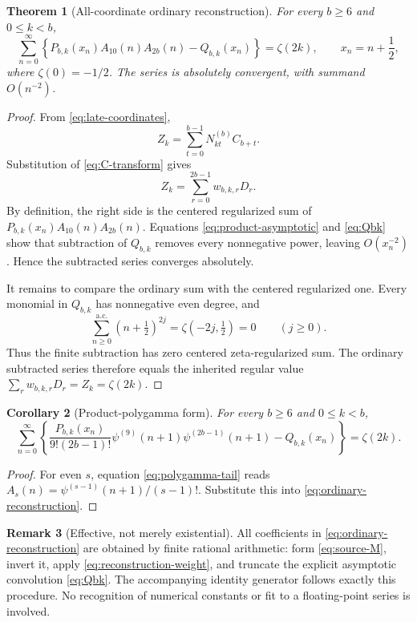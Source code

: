 \documentclass[11pt]{article}
\newtheorem{theorem}{Theorem}[section]
\newtheorem{corollary}[theorem]{Corollary}
\theoremstyle{definition}
\newtheorem{remark}[theorem]{Remark}
\begin{document}
\begin{theorem}[All-coordinate ordinary reconstruction]
\label{thm:ordinary-reconstruction}
For every $b\ge6$ and $0\le k<b$,
\begin{equation}
 \boxed{\displaystyle
 \sum_{n=0}^{\infty}
 \left\{
 P_{b,k}(x_n)A_{10}(n)A_{2b}(n)-Q_{b,k}(x_n)
 \right\}=\zeta(2k),}
 \qquad x_n=n+\frac12,
 \label{eq:ordinary-reconstruction}
\end{equation}
where $\zeta(0)=-1/2$.  The series is absolutely convergent, with
summand $O(n^{-2})$.
\end{theorem}

\begin{proof}
From \eqref{eq:late-coordinates},
\[
 Z_k=\sum_{t=0}^{b-1}N^{(b)}_{kt}C_{b+t}.
\]
Substitution of \eqref{eq:C-transform} gives
\[
 Z_k=\sum_{r=0}^{2b-1}w_{b,k,r}D_r.
\]
By definition, the right side is the centered regularized sum of
$P_{b,k}(x_n)A_{10}(n)A_{2b}(n)$.  Equations
\eqref{eq:product-asymptotic} and \eqref{eq:Qbk} show that subtraction
of $Q_{b,k}$ removes every nonnegative power, leaving $O(x_n^{-2})$.
Hence the subtracted series converges absolutely.

It remains to compare the ordinary sum with the centered regularized
one.  Every monomial in $Q_{b,k}$ has nonnegative even degree, and
\[
 \sum_{n\ge0}^{\mathrm{a.c.}}(n+\tfrac12)^{2j}
   =\zeta(-2j,\tfrac12)=0\qquad(j\ge0).
\]
Thus the finite subtraction has zero centered zeta-regularized sum.
The ordinary subtracted series therefore equals the inherited regular
value $\sum_rw_{b,k,r}D_r=Z_k=\zeta(2k)$.
\end{proof}

\begin{corollary}[Product-polygamma form]
\label{cor:polygamma-reconstruction}
For every $b\ge6$ and $0\le k<b$,
\begin{equation}
 \sum_{n=0}^{\infty}
 \left\{
 \frac{P_{b,k}(x_n)}{9!(2b-1)!}
 \psi^{(9)}(n+1)\psi^{(2b-1)}(n+1)
 -Q_{b,k}(x_n)
 \right\}=\zeta(2k).
 \label{eq:polygamma-reconstruction}
\end{equation}
\end{corollary}

\begin{proof}
For even $s$, equation \eqref{eq:polygamma-tail} reads
$A_s(n)=\psi^{(s-1)}(n+1)/(s-1)!$.  Substitute this into
\eqref{eq:ordinary-reconstruction}.
\end{proof}

\begin{remark}[Effective, not merely existential]
All coefficients in \eqref{eq:ordinary-reconstruction} are obtained by
finite rational arithmetic: form \eqref{eq:source-M}, invert it, apply
\eqref{eq:reconstruction-weight}, and truncate the explicit asymptotic
convolution \eqref{eq:Qbk}.  The accompanying identity generator follows
exactly this procedure.  No recognition of numerical constants or fit
to a floating-point series is involved.
\end{remark}
\end{document}

